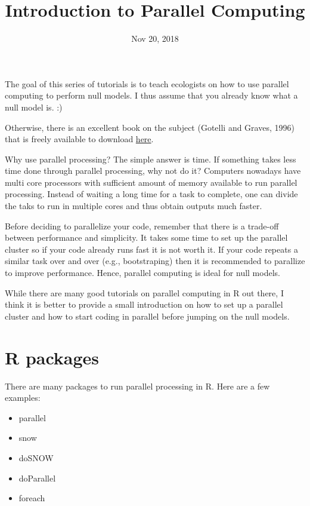 \documentclass[]{article}
\title{Introduction to Parallel Computing}
\author{}
\date{Nov 20, 2018}
\providecommand{\tightlist}{%
  \setlength{\itemsep}{0pt}\setlength{\parskip}{0pt}}
\begin{document}
\maketitle

The goal of this series of tutorials is to teach ecologists on how to
use parallel computing to perform null models. I thus assume that you
already know what a null model is. :)

Otherwise, there is an excellent book on the subject (Gotelli and
Graves, 1996) that is freely available to download
\href{https://www.uvm.edu/~ngotelli/nullmodelspage.html}{here}.

Why use parallel processing? The simple answer is time. If something
takes less time done through parallel processing, why not do it?
Computers nowadays have multi core processors with sufficient amount of
memory available to run parallel processing. Instead of waiting a long
time for a task to complete, one can divide the taks to run in multiple
cores and thus obtain outputs much faster.

Before deciding to parallelize your code, remember that there is a
trade-off between performance and simplicity. It takes some time to set
up the parallel cluster so if your code already runs fast it is not
worth it. If your code repeats a similar task over and over (e.g.,
bootstraping) then it is recommended to parallize to improve
performance. Hence, parallel computing is ideal for null models.

While there are many good tutorials on parallel computing in R out
there, I think it is better to provide a small introduction on how to
set up a parallel cluster and how to start coding in parallel before
jumping on the null models.

\section{R packages}\label{r-packages}

There are many packages to run parallel processing in R. Here are a few
examples:

\begin{itemize}
\tightlist
\item
  parallel
\item
  snow
\item
  doSNOW
\item
  doParallel
\item
  foreach
\end{itemize}
\end{document}
